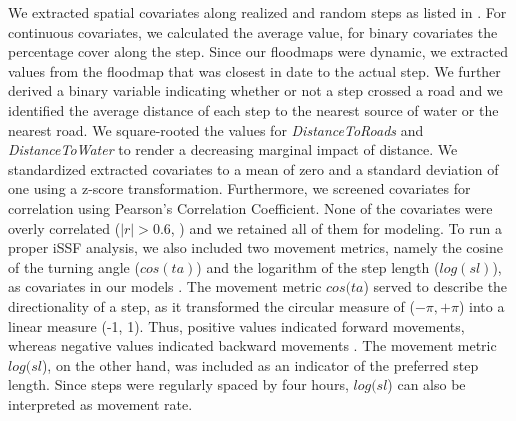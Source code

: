 \documentclass[abstract=on,10pt,a4paper,bibliography=totocnumbered]{scrartcl}
\begin{document}
We extracted spatial covariates along realized and random steps as listed in
. For continuous covariates, we calculated the average
value, for binary covariates the percentage cover along the step. Since our
floodmaps were dynamic, we extracted values from the floodmap that was closest
in date to the actual step. We further derived a binary variable indicating
whether or not a step crossed a road and we identified the average distance of
each step to the nearest source of water or the nearest road. We square-rooted
the values for \textit{DistanceToRoads} and \textit{DistanceToWater} to render a
decreasing marginal impact of distance. We standardized extracted covariates to
a mean of zero and a standard deviation of one using a z-score transformation.
Furthermore, we screened covariates for correlation using Pearson's Correlation
Coefficient. None of the covariates were overly correlated (\(|r| > 0.6\),
\citealp{Latham.2011}) and we retained all of them for modeling. To run a proper
iSSF analysis, we also included two movement metrics, namely the cosine of the
turning angle (\(cos(ta)\)) and the logarithm of the step length (\(log(sl)\)),
as covariates in our models \citep{Avgar.2016}. The movement metric \(cos(ta\))
served to describe the directionality of a step, as it transformed the circular
measure of (\(-\pi, +\pi\)) into a linear measure (-1, 1). Thus, positive values
indicated forward movements, whereas negative values indicated backward
movements \citep{Turchin.1998}. The movement metric \(log(sl\)), on the other
hand, was included as an indicator of the preferred step length. Since steps
were regularly spaced by four hours, \(log(sl\)) can also be interpreted as
movement rate.
\end{document}
